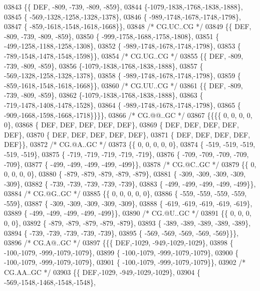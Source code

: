 \begin{DoxyCode}
03843 \{\{  DEF, -809, -739, -809, -859\},
03844 \{-1079,-1838,-1768,-1838,-1888\},
03845 \{ -569,-1328,-1258,-1328,-1378\},
03846 \{ -989,-1748,-1678,-1748,-1798\},
03847 \{ -859,-1618,-1548,-1618,-1668\}\},
03848 \textcolor{comment}{/* CG.UC..CG */}
03849 \{\{  DEF, -809, -739, -809, -859\},
03850 \{ -999,-1758,-1688,-1758,-1808\},
03851 \{ -499,-1258,-1188,-1258,-1308\},
03852 \{ -989,-1748,-1678,-1748,-1798\},
03853 \{ -789,-1548,-1478,-1548,-1598\}\},
03854 \textcolor{comment}{/* CG.UG..CG */}
03855 \{\{  DEF, -809, -739, -809, -859\},
03856 \{-1079,-1838,-1768,-1838,-1888\},
03857 \{ -569,-1328,-1258,-1328,-1378\},
03858 \{ -989,-1748,-1678,-1748,-1798\},
03859 \{ -859,-1618,-1548,-1618,-1668\}\},
03860 \textcolor{comment}{/* CG.UU..CG */}
03861 \{\{  DEF, -809, -739, -809, -859\},
03862 \{-1079,-1838,-1768,-1838,-1888\},
03863 \{ -719,-1478,-1408,-1478,-1528\},
03864 \{ -989,-1748,-1678,-1748,-1798\},
03865 \{ -909,-1668,-1598,-1668,-1718\}\}\}\},
03866 \textcolor{comment}{/* CG.@@..GC */}
03867 \{\{\{\{    0,    0,    0,    0,    0\},
03868 \{  DEF,  DEF,  DEF,  DEF,  DEF\},
03869 \{  DEF,  DEF,  DEF,  DEF,  DEF\},
03870 \{  DEF,  DEF,  DEF,  DEF,  DEF\},
03871 \{  DEF,  DEF,  DEF,  DEF,  DEF\}\},
03872 \textcolor{comment}{/* CG.@A..GC */}
03873 \{\{    0,    0,    0,    0,    0\},
03874 \{ -519, -519, -519, -519, -519\},
03875 \{ -719, -719, -719, -719, -719\},
03876 \{ -709, -709, -709, -709, -709\},
03877 \{ -499, -499, -499, -499, -499\}\},
03878 \textcolor{comment}{/* CG.@C..GC */}
03879 \{\{    0,    0,    0,    0,    0\},
03880 \{ -879, -879, -879, -879, -879\},
03881 \{ -309, -309, -309, -309, -309\},
03882 \{ -739, -739, -739, -739, -739\},
03883 \{ -499, -499, -499, -499, -499\}\},
03884 \textcolor{comment}{/* CG.@G..GC */}
03885 \{\{    0,    0,    0,    0,    0\},
03886 \{ -559, -559, -559, -559, -559\},
03887 \{ -309, -309, -309, -309, -309\},
03888 \{ -619, -619, -619, -619, -619\},
03889 \{ -499, -499, -499, -499, -499\}\},
03890 \textcolor{comment}{/* CG.@U..GC */}
03891 \{\{    0,    0,    0,    0,    0\},
03892 \{ -879, -879, -879, -879, -879\},
03893 \{ -389, -389, -389, -389, -389\},
03894 \{ -739, -739, -739, -739, -739\},
03895 \{ -569, -569, -569, -569, -569\}\}\},
03896 \textcolor{comment}{/* CG.A@..GC */}
03897 \{\{\{  DEF,-1029, -949,-1029,-1029\},
03898 \{ -100,-1079, -999,-1079,-1079\},
03899 \{ -100,-1079, -999,-1079,-1079\},
03900 \{ -100,-1079, -999,-1079,-1079\},
03901 \{ -100,-1079, -999,-1079,-1079\}\},
03902 \textcolor{comment}{/* CG.AA..GC */}
03903 \{\{  DEF,-1029, -949,-1029,-1029\},
03904 \{ -569,-1548,-1468,-1548,-1548\},

\end{DoxyCode}
